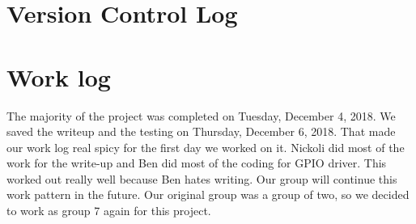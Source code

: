 \documentclass[10pt,english]{article}
\begin{document}
\section{Version Control Log}



\section{Work log}

The majority of the project was completed on Tuesday, December 4, 2018. We saved the writeup and the testing on Thursday, December 6, 2018. That made our work log real spicy for the first day we worked on it. Nickoli did most of the work for the write-up and Ben did most of the coding for GPIO driver. This worked out really well because Ben hates writing. Our group will continue this work pattern in the future. Our original group was a group of two, so we decided to work as group 7 again for this project.
 
\end{document}
